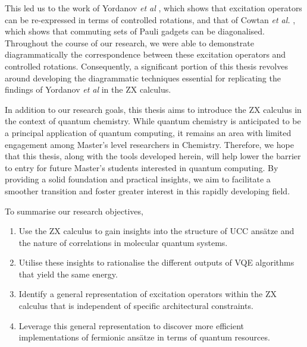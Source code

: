 This led us to the work of Yordanov \textit{et al} \cite{Yordanov2020}, which shows that excitation operators can be re-expressed in terms of controlled rotations, and that of Cowtan \textit{et al.} \cite{Cowtan2020}, which shows that commuting sets of Pauli gadgets can be diagonalised. Throughout the course of our research, we were able to demonstrate diagrammatically the correspondence between these excitation operators and controlled rotations. Consequently, a significant portion of this thesis revolves around developing the diagrammatic techniques essential for replicating the findings of Yordanov \textit{et al} in the ZX calculus.

In addition to our research goals, this thesis aims to introduce the ZX calculus in the context of quantum chemistry. While quantum chemistry is anticipated to be a principal application of quantum computing, it remains an area with limited engagement among Master's level researchers in Chemistry. Therefore, we hope that this thesis, along with the tools developed herein, will help lower the barrier to entry for future Master's students interested in quantum computing. By providing a solid foundation and practical insights, we aim to facilitate a smoother transition and foster greater interest in this rapidly developing field.

To summarise our research objectives,
\begin{enumerate}[itemsep=-5pt]
\item Use the ZX calculus to gain insights into the structure of UCC ansätze and the nature of correlations in molecular quantum systems.
\item Utilise these insights to rationalise the different outputs of VQE algorithms that yield the same energy.
\item Identify a general representation of excitation operators within the ZX calculus that is independent of specific architectural constraints.
\item Leverage this general representation to discover more efficient implementations of fermionic ansätze in terms of quantum resources.
\end{enumerate}
